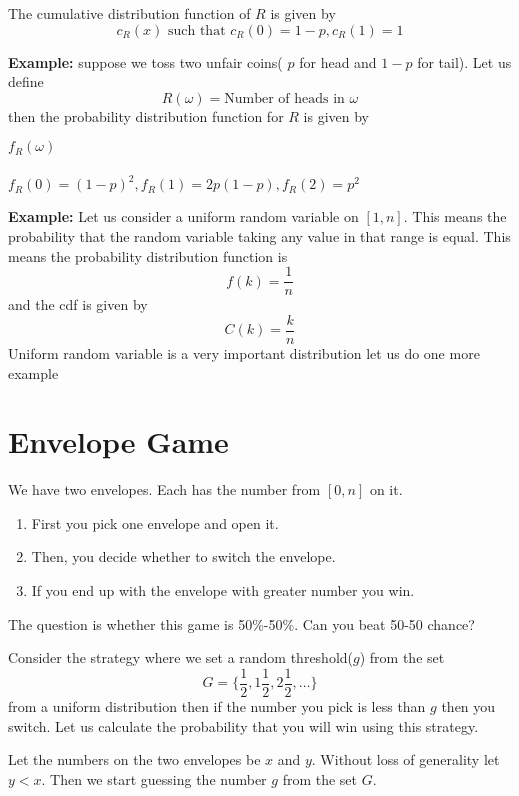 \documentclass[a4paper, 12pt]{article}
\newcommand{\example}{\vspace{1em}\noindent\textbf{Example:} }
\begin{document}
\begin{multicols}{2}
The cumulative distribution function of $R$ is given by
\[
	c_R(x) \text{ such that } c_R(0) = 1-p, c_R(1) = 1
\]

\example suppose we toss two unfair coins( $p$ for head and $1-p$ for tail). Let us define
\[
	R(\omega) = \text{Number of heads in }\omega
\]
then the probability distribution function for $R$ is given by
\begin{center}
	$f_R(\omega) $\\
	\\
	$f_R(0) = (1-p)^2, f_R(1) = 2p(1-p), f_R(2) = p^2$
\end{center}

\example Let us consider a uniform random variable on $[1,n]$. This means the probability that the random variable taking any value in that range is equal. This means the probability distribution function is 
\[
	f(k) = \frac{1}{n}
\]
and the cdf is given by
\[
	C(k) = \frac{k}{n}
\]
Uniform random variable is a very important distribution let us do one more example

\section*{Envelope Game}
We have two envelopes. Each has the number from $[0,n]$ on it.
\begin{enumerate}
	\item First you pick one envelope and open it.
	\item Then, you decide whether to switch the envelope.
	\item If you end up with the envelope with greater number you win.
\end{enumerate}
The question is whether this game is 50\%-50\%. Can you beat 50-50 chance?

Consider the strategy where we set a random threshold($g$) from the set 
\[
	G = \{ \frac{1}{2}, 1 \frac{1}{2}, 2\frac{1}{2}, \ldots \}
\]
from a uniform distribution then if the number you pick is less than $g$ then you switch. Let us calculate the probability that you will win using this strategy.

Let the numbers on the two envelopes be $x$ and $y$. Without loss of generality let $y<x$. Then we start guessing the number $g$ from the set $G$. 
\end{multicols}
\end{document}
